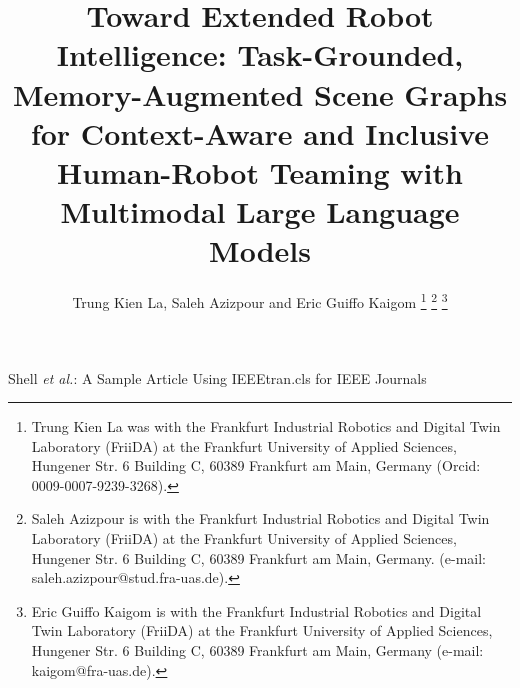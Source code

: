 \documentclass[lettersize,journal]{IEEEtran}
\begin{document}
	
	\title{Toward Extended Robot Intelligence: Task-Grounded, Memory-Augmented Scene Graphs for Context-Aware and Inclusive Human-Robot Teaming with Multimodal Large Language Models}
	
	\author{Trung Kien La, Saleh Azizpour and Eric Guiffo Kaigom
		\thanks{Trung Kien La was with the Frankfurt Industrial Robotics and Digital Twin Laboratory (FriiDA) at the Frankfurt University of Applied Sciences, Hungener Str. 6 Building C, 60389 Frankfurt am Main, Germany (Orcid: 0009-0007-9239-3268).}%
		\thanks{Saleh Azizpour is with the Frankfurt Industrial Robotics and Digital Twin Laboratory (FriiDA) at the Frankfurt University of Applied Sciences, Hungener Str. 6 Building C, 60389 Frankfurt am Main, Germany. (e-mail: saleh.azizpour@stud.fra-uas.de).}%
		\thanks{Eric Guiffo Kaigom is with the Frankfurt Industrial Robotics and Digital Twin Laboratory (FriiDA) at the Frankfurt University of Applied Sciences, Hungener Str. 6 Building C, 60389 Frankfurt am Main, Germany (e-mail: kaigom@fra-uas.de).}}
	
	{Shell \MakeLowercase{\textit{et al.}}: A Sample Article Using IEEEtran.cls for IEEE Journals}
	
	
	\maketitle
	
\end{document}
